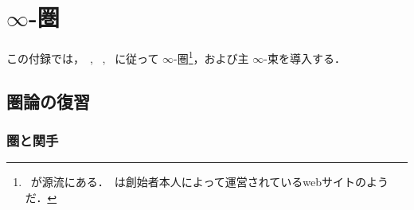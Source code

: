 \documentclass[TQFT_main]{subfiles}
\begin{document}
\chapter{$\infty$-圏}

この付録では，~\cite{Land2021infinity}, ~\cite{alfonsi2023higher}, ~\cite{Kerodon}に従って $\infty$-圏\footnote{~\cite{lurie2008higher}が源流にある．~\cite{Kerodon}は創始者本人によって運営されているwebサイトのようだ．}，および主 $\infty$-束を導入する．

\section{圏論の復習}

\subsection{圏と関手}
\end{document}
